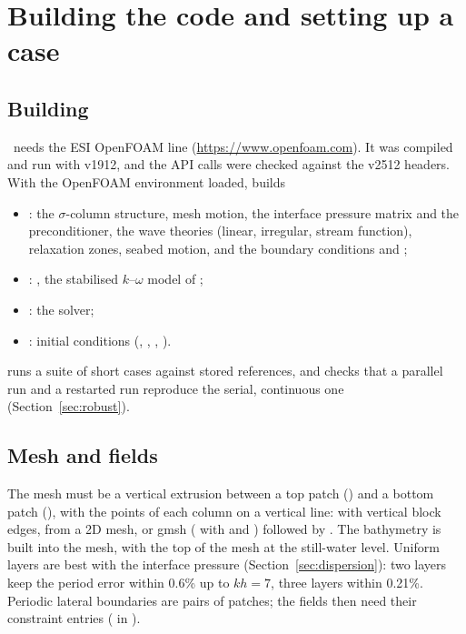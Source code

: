 \section{Building the code and setting up a case}
\label{app:usage}

\subsection{Building}

\NHFOAM\ needs the ESI OpenFOAM line (\url{https://www.openfoam.com}). It was
compiled and run with v1912, and the API calls were checked against the
v2512 headers. With the OpenFOAM environment loaded,  builds
\begin{itemize}[nosep]
  \item {}: the $\sigma$-column structure, mesh motion, the
        interface pressure matrix and the  preconditioner,
        the wave theories (linear, irregular, stream function), relaxation
        zones, seabed motion, and the boundary conditions
         and ;
  \item {}: , the
        stabilised $k$--$\omega$ model of \citet{larsen2018};
  \item {}: the solver;
  \item {}: initial conditions (,
        , , ).
\end{itemize}
 runs a suite of short cases against stored
references, and checks that a parallel run and a restarted run reproduce the
serial, continuous one (Section~\ref{sec:robust}).

\subsection{Mesh and fields}

The mesh must be a vertical extrusion between a top patch () and
a bottom patch (), with the points of each column on a vertical
line:  with vertical block edges,  from a 2D
mesh, or gmsh ( with  and ) followed
by . The bathymetry is built into the mesh, with the top of
the mesh at the still-water level. Uniform layers are best with the interface
pressure (Section~\ref{sec:dispersion}): two layers keep the period error within
0.6\% up to $kh = 7$, three layers within 0.21\%. Periodic lateral boundaries
are pairs of  patches; the fields then need their constraint
entries ( in
).

